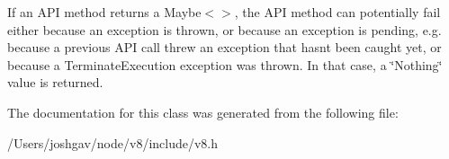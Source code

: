 If an A\+PI method returns a Maybe$<$$>$, the A\+PI method can potentially fail either because an exception is thrown, or because an exception is pending, e.\+g. because a previous A\+PI call threw an exception that hasn\textquotesingle{}t been caught yet, or because a Terminate\+Execution exception was thrown. In that case, a \char`\"{}\+Nothing\char`\"{} value is returned. 

The documentation for this class was generated from the following file\+:\begin{DoxyCompactItemize}
\item 
/\+Users/joshgav/node/v8/include/v8.\+h\end{DoxyCompactItemize}

